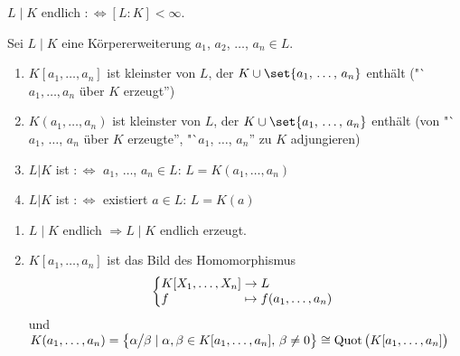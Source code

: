 \begin{definition}
	$L\mid K$ endlich $:\Leftrightarrow [L:K] < \infty$.
\end{definition}


\begin{definition}
	Sei $L\mid K$ eine Körpererweiterung $a_1$, $a_2$, $\dots$, $a_n \in L$.
	\begin{enumerate}[label=(\alph*)]
		\item $K[a_1,\dots,a_n]$ ist kleinster  von $L$, der $K \cup \set{a_1,\, \dots,\, a_n}$ enthält ("`$a_1, \dots, a_n$ über $K$ erzeugt'')
		\item $K(a_1,\dots,a_n)$ ist kleinster  von $L$, der $K \cup \set{a_1,\, \dots,\, a_n}$ enthält (von "`$a_1$, $\dots$, $a_n$ über $K$ erzeugte'', "`$a_1$, $\dots$, $a_n$'' zu $K$ adjungieren)
		\item $L | K$ ist  $:\Leftrightarrow$ $a_1$, $\dots$, $a_n \in L$: $L=K(a_1, \dots, a_n)$
		\item $L | K$ ist  $:\Leftrightarrow$ existiert $a \in L$: $L=K(a)$  
	\end{enumerate}
\end{definition}

\begin{remark}
	\begin{enumerate}[label=(\alph*)]
		\item $L\mid K$ endlich $\Rightarrow L\mid K$ endlich erzeugt.
		\item $K[a_1, \dots, a_n]$ ist das Bild des Homomorphismus
		\begin{align*}
		\left\lbrace\begin{array}{@{}l@{\;}c@{\;}l}
		K[X_1, \dots, X_n] &\to& L\\
		f &\mapsto& f(a_1, \dots, a_n)
		\end{array}\right.
		\end{align*}
		und $K(a_1, \dots , a_n) = \big\{\alpha\mskip-1mu\big\slash\mskip-1mu \beta \mid \alpha, \beta \in K[a_1, \dots, a_n],\, \beta \neq 0\big\} \cong \operatorname{Quot}\big(K[a_1, \dots, a_n]\big)$
	\end{enumerate}
\end{remark}
